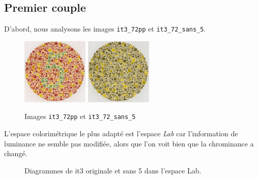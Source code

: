 \documentclass[a4paper,11pt]{article}
\begin{document}
\subsection{Premier couple}

D'abord, nous analysons les images \texttt{it3\_72pp} et 
\texttt{it3\_72\_sans\_5}.

\begin{figure}[H]
  \begin{center}  
    \includegraphics[width=120px]{images/it3_72pp.png}
    \includegraphics[width=120px]{images/it3_72pp_sans_5.png}
    \caption{Images \texttt{it3\_72pp} et \texttt{it3\_72\_sans\_5}}
  \end{center}
\end{figure}

L'espace colorimétrique le plus adapté est l'espace \textit{Lab} car 
l'information de luminance ne semble pas modifiée, alors que l'on 
voit bien que la chrominance a changé.

\begin{figure}[H]
  \begin{center}  
    \caption{Diagrammes de it3 originale et sans 5 dans l’espace Lab.}
  \end{center}
\end{figure}
\end{document}
